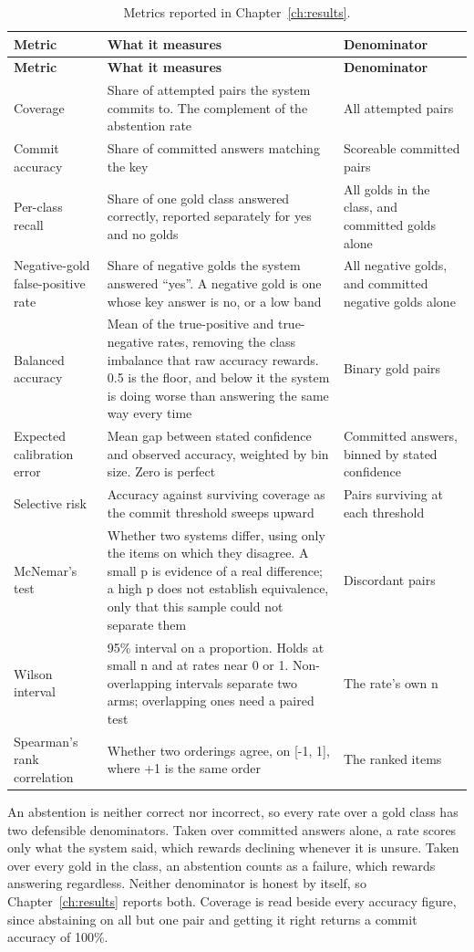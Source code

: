 {\small
\begin{longtable}[]{@{}
  L{0.2451}
  L{0.5196}
  L{0.2353}@{}}
\caption{Metrics reported in Chapter~\ref{ch:results}.}\label{tab:metrics}\\
\toprule\noalign{}
\textbf{Metric} & \textbf{What it measures} & \textbf{Denominator} \\
\midrule\noalign{}
\endfirsthead
\toprule\noalign{}
\textbf{Metric} & \textbf{What it measures} & \textbf{Denominator} \\
\midrule\noalign{}
\endhead
\bottomrule\noalign{}
\endlastfoot
Coverage & Share of attempted pairs the system commits to. The complement of the abstention rate & All attempted pairs \\
Commit accuracy & Share of committed answers matching the key & Scoreable committed pairs \\
Per-class recall & Share of one gold class answered correctly, reported separately for yes and no golds & All golds in the class, and committed golds alone \\
Negative-gold false-positive rate & Share of negative golds the system answered ``yes''. A negative gold is one whose key answer is no, or a low band & All negative golds, and committed negative golds alone \\
Balanced accuracy & Mean of the true-positive and true-negative rates, removing the class imbalance that raw accuracy rewards. 0.5 is the floor, and below it the system is doing worse than answering the same way every time & Binary gold pairs \\
Expected calibration error & Mean gap between stated confidence and observed accuracy, weighted by bin size. Zero is perfect & Committed answers, binned by stated confidence \\
Selective risk & Accuracy against surviving coverage as the commit threshold sweeps upward & Pairs surviving at each threshold \\
McNemar's test & Whether two systems differ, using only the items on which they disagree. A small p is evidence of a real difference; a high p does not establish equivalence, only that this sample could not separate them & Discordant pairs \\
Wilson interval & 95\% interval on a proportion. Holds at small n and at rates near 0 or 1. Non-overlapping intervals separate two arms; overlapping ones need a paired test & The rate's own n \\
Spearman's rank correlation & Whether two orderings agree, on {[}-1, 1{]}, where +1 is the same order & The ranked items \\
\end{longtable}
}

An abstention is neither correct nor incorrect, so every rate over a gold class has two defensible denominators. Taken over committed answers alone, a rate scores only what the system said, which rewards declining whenever it is unsure. Taken over every gold in the class, an abstention counts as a failure, which rewards answering regardless. Neither denominator is honest by itself, so Chapter~\ref{ch:results} reports both. Coverage is read beside every accuracy figure, since abstaining on all but one pair and getting it right returns a commit accuracy of 100\%.
